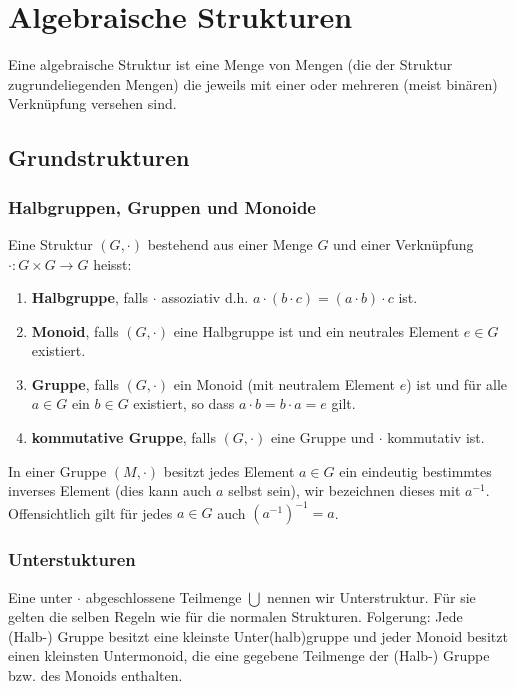 \chapter{Algebraische Strukturen}
Eine algebraische Struktur ist eine Menge von Mengen (die der Struktur zugrundeliegenden Mengen) die jeweils mit einer oder mehreren (meist binären) Verknüpfung versehen sind.
\section{Grundstrukturen}
\subsection{Halbgruppen, Gruppen und Monoide}
\begin{definition}
Eine Struktur $(G, \cdot)$ bestehend aus einer Menge $G$ und einer Verknüpfung $\cdot : G \times G \rightarrow G$ heisst:
\begin{enumerate}
	\item \textbf{Halbgruppe}, falls $\cdot$ assoziativ d.h. $a \cdot ( b \cdot c) = (a \cdot b) \cdot c$ ist.
	\item \textbf{Monoid}, falls $(G, \cdot)$ eine Halbgruppe ist und ein neutrales Element $e \in G$ existiert.
	\item \textbf{Gruppe}, falls $(G, \cdot)$ ein Monoid (mit neutralem Element $e$) ist und für alle $a \in G$ ein $b \in G$ existiert, so dass $a \cdot b = b \cdot a = e$ gilt.
	\item \textbf{kommutative Gruppe}, falls $(G, \cdot)$ eine Gruppe und $\cdot$ kommutativ ist.
\end{enumerate}
\end{definition}

\begin{bem}
In einer Gruppe $(M, \cdot)$ besitzt jedes Element $a \in G$ ein eindeutig bestimmtes inverses Element (dies kann auch $a$ selbst sein), wir bezeichnen dieses mit $a^{-1}$. Offensichtlich gilt für jedes $a \in G$ auch $(a^{-1})^{-1} = a$.
\end{bem}
\pagebreak

\subsection{Unterstukturen}
Eine unter $\cdot$ abgeschlossene Teilmenge $\bigcup$ nennen wir Unterstruktur. Für sie gelten die selben Regeln wie für die normalen Strukturen. Folgerung: Jede (Halb-) Gruppe besitzt eine kleinste Unter(halb)gruppe und jeder Monoid besitzt einen kleinsten Untermonoid, die eine gegebene Teilmenge der (Halb-) Gruppe bzw. des Monoids enthalten.

